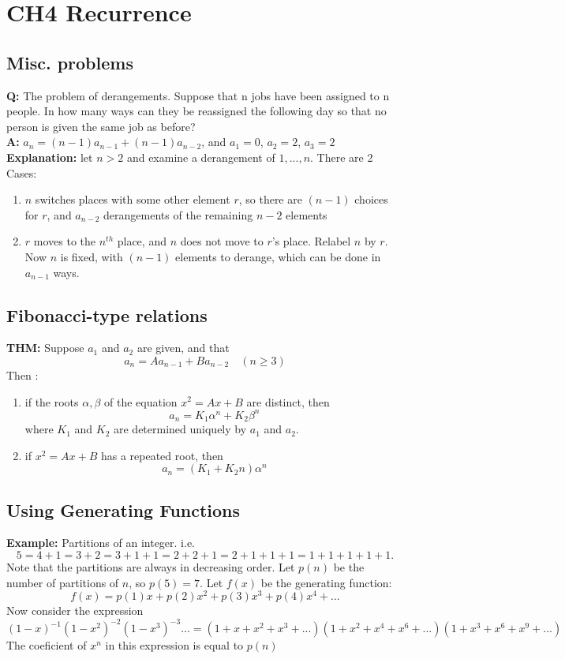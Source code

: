 \documentclass[12pt]{article}
\begin{document}
	
	\section{CH4 Recurrence}
	\subsection{Misc. problems}
	\textbf{Q: }The problem of derangements. Suppose that n jobs have
	been assigned to n people. In how many ways can they be reassigned the	following day so that no person is given the same job as before?\\
	\textbf{A: }$ a_n = (n-1)a_{n-1} + (n-1)a_{n-2} $, and $ a_1 = 0 $, $ a_2 = 2 $, $ a_3 = 2 $\\
	\textbf{Explanation: } let $ n>2 $ and examine a derangement of $ 1, ..., n $. There are 2 Cases: 
	\begin{enumerate}
		\item $ n $ switches places with some other element $ r $, so there are $ (n-1) $ choices for $ r $, and $ a_{n-2} $ derangements of the remaining $ n-2 $ elements
		\item $ r $ moves to the $ n^{th} $ place, and $ n $ does not move to $ r $'s place. Relabel $ n $ by $ r $. Now $ n $ is fixed, with $ (n-1) $ elements to derange, which can be done in $ a_{n-1} $ ways. 
	\end{enumerate}
	\subsection{Fibonacci-type relations}
	\textbf{THM: } Suppose $ a_1 $ and $ a_2 $ are given, and that 
	\[
		a_n = Aa_{n-1} + Ba_{n-2} \quad (n\geq 3)
	\]
	Then : 
	\begin{enumerate}
		\item if the roots $ \alpha, \beta $ of the equation $ x^2 = Ax + B $ are distinct, then 
		\[ a_n = K_1\alpha^n + K_2\beta^n \]
		where $ K_1 $ and $ K_2 $ are determined uniquely by $ a_1 $ and $ a_2 $.
		\item if $ x^2 = Ax + B $ has a repeated root, then 
		\[ a_n = (K_1 + K_2n)\alpha^n \]
	\end{enumerate}
	\subsection{Using Generating Functions}
	\textbf{Example: } Partitions of an integer. i.e.
	\[
		5 = 4+ 1 =		3 + 2 =		3 + 1 + 1=2 + 2 + 1=
		2+ 1 + 1 + 1 =
		1 + 1 + 1 + 1 + 1.
	\]
	Note that the partitions are always in decreasing order. Let $ p(n) $ be the number of partitions of $ n $, so $ p(5)=7 $. Let $ f(x) $ be the generating function: 
	\[
		f(x) = p(1)x + p(2)x^2+ p(3)x^3+ p(4)x^4 +...
	\]
	Now consider the expression 
	\[
		(1-x)^{-1}(1-x^2)^{-2}(1-x^3)^{-3}... = (1 + x + x^2 + x^3 + ...)(1 + x^2 + x^4 + x^6 + ...)(1 + x^3 + x^6 + x^9 + ...)
	\]
	The coeficient of $ x^n  $ in this expression is equal to $ p(n) $
\end{document}
